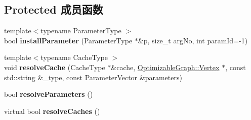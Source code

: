 \subsection*{Protected 成员函数}
\begin{DoxyCompactItemize}
\item 
\hypertarget{classg2o_1_1OptimizableGraph_1_1Edge_a237bea2f2fb7cc6a9cf4ee5ee6fe4d88}{{\footnotesize template$<$typename Parameter\-Type $>$ }\\bool {\bfseries install\-Parameter} (Parameter\-Type $\ast$\&p, size\-\_\-t arg\-No, int param\-Id=-\/1)}\label{classg2o_1_1OptimizableGraph_1_1Edge_a237bea2f2fb7cc6a9cf4ee5ee6fe4d88}

\item 
\hypertarget{classg2o_1_1OptimizableGraph_1_1Edge_ad95f2883af693de56e46a2b272dc1cdc}{{\footnotesize template$<$typename Cache\-Type $>$ }\\void {\bfseries resolve\-Cache} (Cache\-Type $\ast$\&cache, \hyperlink{classg2o_1_1OptimizableGraph_1_1Vertex}{Optimizable\-Graph\-::\-Vertex} $\ast$, const std\-::string \&\-\_\-type, const Parameter\-Vector \&parameters)}\label{classg2o_1_1OptimizableGraph_1_1Edge_ad95f2883af693de56e46a2b272dc1cdc}

\item 
\hypertarget{classg2o_1_1OptimizableGraph_1_1Edge_addadf494f3a1c8bf467a74454d771d0d}{bool {\bfseries resolve\-Parameters} ()}\label{classg2o_1_1OptimizableGraph_1_1Edge_addadf494f3a1c8bf467a74454d771d0d}

\item 
\hypertarget{classg2o_1_1OptimizableGraph_1_1Edge_aa93e3a4f976b467994f4eb7679a04bf3}{virtual bool {\bfseries resolve\-Caches} ()}\label{classg2o_1_1OptimizableGraph_1_1Edge_aa93e3a4f976b467994f4eb7679a04bf3}

\end{DoxyCompactItemize}
